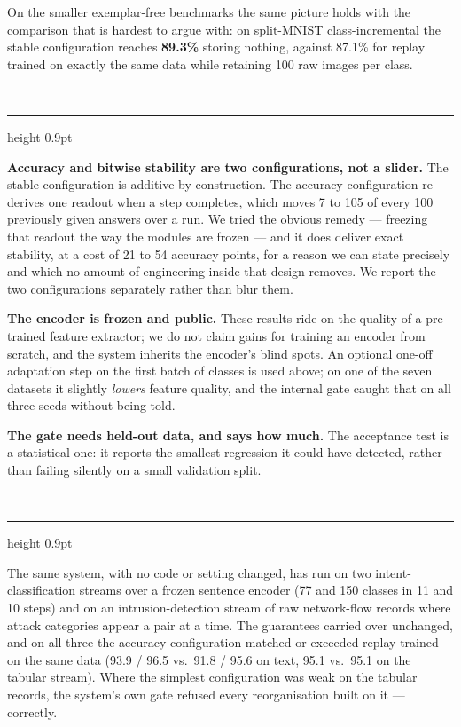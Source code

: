 \documentclass[11pt,a4paper]{article}
\newcommand{\eyebrow}[1]{%
  \vspace{0.9em}{\color{accent}\footnotesize\bfseries\MakeUppercase{#1}}\\[-0.35em]
  {\color{rule}\hrule height 0.9pt}\vspace{0.5em}}
\begin{document}
On the smaller exemplar-free benchmarks the same picture holds with the
comparison that is hardest to argue with: on split-MNIST class-incremental the
stable configuration reaches \textbf{89.3\%} storing nothing, against
87.1\% for replay trained on exactly the same data while retaining 100 raw
images per class.

\eyebrow{What it costs, stated plainly}

\textbf{Accuracy and bitwise stability are two configurations, not a slider.}
The stable configuration is additive by construction. The accuracy
configuration re-derives one readout when a step completes, which moves
7 to 105 of every 100 previously given answers over a run. We
tried the obvious remedy --- freezing that readout the way the modules are
frozen --- and it does deliver exact stability, at a cost of 21 to
54 accuracy points, for a reason we can state precisely and which no
amount of engineering inside that design removes. We report the two
configurations separately rather than blur them.

\textbf{The encoder is frozen and public.} These results ride on the quality of
a pre-trained feature extractor; we do not claim gains for training an encoder
from scratch, and the system inherits the encoder's blind spots. An optional
one-off adaptation step on the first batch of classes is used above; on one of
the seven datasets it slightly \emph{lowers} feature quality, and the internal
gate caught that on all three seeds without being told.

\textbf{The gate needs held-out data, and says how much.} The acceptance test is
a statistical one: it reports the smallest regression it could have detected,
rather than failing silently on a small validation split.

\newpage

\eyebrow{Beyond images}

The same system, with no code or setting changed, has run on two
intent-classification streams over a frozen sentence encoder (77 and 150
classes in 11 and 10 steps) and on an intrusion-detection stream of raw
network-flow records where attack categories appear a pair at a time. The
guarantees carried over unchanged, and on all three the accuracy configuration
matched or exceeded replay trained on the same data (93.9 / 96.5 vs.\
91.8 / 95.6 on text, 95.1 vs.\ 95.1 on the tabular stream). Where the
simplest configuration was weak on the tabular records, the system's own gate
refused every reorganisation built on it --- correctly.
\end{document}
